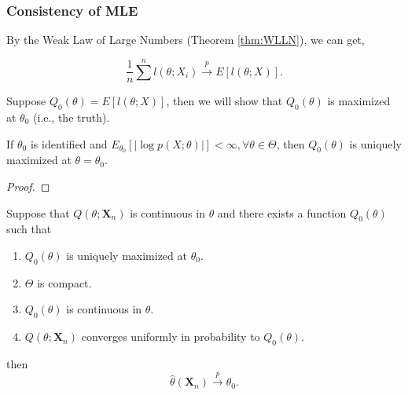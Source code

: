 \subsubsection{Consistency of MLE}

By the Weak Law of Large Numbers (Theorem \ref{thm:WLLN}), we can get,

\begin{equation}
    \frac{1}{n}\sum^{n}l\left(\theta;X_{i}\right)\stackrel{p}{\rightarrow}E\left[l(\theta;X)\right].
\end{equation}

Suppose $Q_{0}(\theta)=E\left[l(\theta;X)\right]$, then we will show that $Q_{0}(\theta)$ is maximized at $\theta_{0}$ (i.e., the truth).

\begin{lemma}
    If $\theta_{0}$ is identified and $E_{\theta_{0}}\left[|\log p(X;\theta)|\right]<\infty,\forall\theta\in\Theta$, then $Q_{0}(\theta)$ is uniquely maximized at $\theta=\theta_{0}$.
\end{lemma}

\begin{proof}

\end{proof}

\begin{theorem}
    Suppose that $Q\left(\theta;\textbf{X}_{n}\right)$ is continuous in $\theta$ and there exists a function $Q_{0}(\theta)$ such that
    \begin{enumerate}
        \item $Q_{0}(\theta)$ is uniquely maximized at $\theta_{0}$.
        \item $\Theta$ is compact.
        \item $Q_{0}(\theta)$ is continuous in $\theta$.
        \item $Q\left(\theta;\textbf{X}_{n}\right)$ converges uniformly in probability to $Q_{0}(\theta)$.
    \end{enumerate}
    then
    \begin{equation}
        \hat{\theta}\left(\textbf{X}_{n}\right)\stackrel{p}{\rightarrow}\theta_{0}.
    \end{equation}
\end{theorem}

